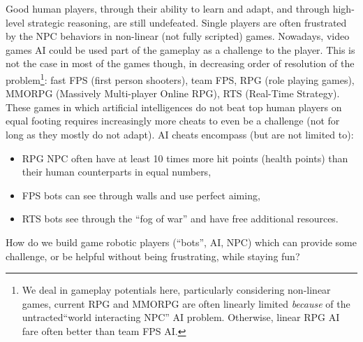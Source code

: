 Good human players, through their ability to learn and adapt, and through high-level strategic reasoning, are still undefeated. Single players are often frustrated by the NPC behaviors in non-linear (not fully scripted) games. Nowadays, video games AI could be used part of the gameplay as a challenge to the player. 
This is not the case in most of the games though, in decreasing order of resolution of the problem\footnote{We deal in gameplay potentials here, particularly considering non-linear games, current RPG and MMORPG are often linearly limited \textit{because} of the untracted``world interacting NPC'' AI problem. Otherwise, linear RPG AI fare often better than team FPS AI.}: fast FPS (first person shooters), team FPS, RPG (role playing games), MMORPG (Massively Multi-player Online RPG), RTS (Real-Time Strategy). These games in which artificial intelligences do not beat top human players on equal footing requires increasingly more cheats to even be a challenge (not for long as they mostly do not adapt). AI cheats encompass (but are not limited to):
\begin{itemize}
\item RPG NPC often have at least 10 times more hit points (health points) than their human counterparts in equal numbers,
\item FPS bots can see through walls and use perfect aiming,
\item RTS bots see through the ``fog of war'' and have free additional resources.
\end{itemize}
How do we build game robotic players (``bots'', AI, NPC) which can provide some challenge, or be helpful without being frustrating, while staying fun?


